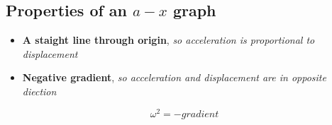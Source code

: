 \documentclass[a4paper,9pt]{scrartcl}
\begin{document}
    \subsection{Properties of an $a-x$ graph}

    \begin{itemize}
        \item \textbf{A staight line through origin}, \textit{so acceleration is proportional to displacement}
        \item \textbf{Negative gradient}, \textit{so acceleration and displacement are in opposite diection}
    \end{itemize}

    \begin{displaymath}
    {\omega}
        ^2 = -gradient
    \end{displaymath}
\end{document}
